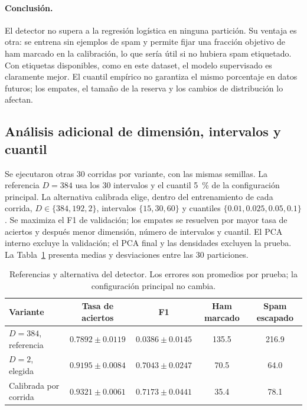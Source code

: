 \paragraph{Conclusión.} El detector no supera a la regresión logística en
ninguna partición. Su ventaja es otra: se entrena sin ejemplos de spam y
permite fijar una fracción objetivo de ham marcado en la calibración, lo que
sería útil si no hubiera spam etiquetado. Con etiquetas disponibles, como en
este dataset, el modelo supervisado es claramente mejor.
El cuantil empírico no garantiza el mismo porcentaje en datos futuros; los
empates, el tamaño de la reserva y los cambios de distribución lo afectan.

\subsection{Análisis adicional de dimensión, intervalos y cuantil}
\label{sec:auditoria-detector}
Se ejecutaron otras 30 corridas por variante, con las mismas semillas.
La referencia $D=384$ usa los 30 intervalos y el cuantil 5~\% de la configuración principal.
La alternativa calibrada elige, dentro del entrenamiento de cada corrida,
$D\in\{384,192,2\}$, intervalos $\{15,30,60\}$ y cuantiles
$\{0.01,0.025,0.05,0.1\}$. Se maximiza el F1 de validación; los empates
se resuelven por mayor tasa de aciertos y después menor dimensión, número
de intervalos y cuantil. El PCA interno excluye la validación; el PCA final
y las densidades excluyen la prueba. La Tabla~\ref{tab:auditoria-detector}
presenta medias y desviaciones entre las 30 particiones.

\begin{table}[H]
    \centering
    \caption{Referencias y alternativa del detector. Los errores son
    promedios por prueba; la configuración principal no cambia.}
    \label{tab:auditoria-detector}
    \small
    \begin{tabular}{lcccc}
        \toprule
        Variante & Tasa de aciertos & F1 & Ham marcado & Spam escapado \\
        \midrule
        $D=384$, referencia & $0.7892\pm0.0119$ & $0.0386\pm0.0145$ & 135.5 & 216.9 \\
        $D=2$, elegida & $0.9195\pm0.0084$ & $0.7043\pm0.0247$ & 70.5 & 64.0 \\
        Calibrada por corrida & $0.9321\pm0.0061$ & $0.7173\pm0.0441$ & 35.4 & 78.1 \\
        \bottomrule
    \end{tabular}
\end{table}

